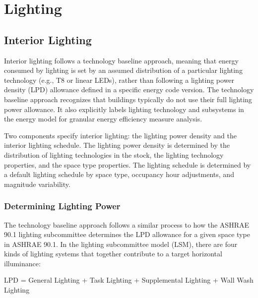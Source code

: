 \section{Lighting}
\subsection{Interior Lighting}
Interior lighting follows a technology baseline approach, meaning that energy consumed by lighting is set by an assumed distribution of a particular lighting technology (e.g., T8 or linear LEDs), rather than following a lighting power density (LPD) allowance defined in a specific energy code version. The technology baseline approach recognizes that buildings typically do not use their full lighting power allowance. It also explicitly labels lighting technology and subsystems in the energy model for granular energy efficiency measure analysis.  

Two components specify interior lighting: the lighting power density and the interior lighting schedule.  The lighting power density is determined by the distribution of lighting technologies in the stock, the lighting technology properties, and the space type properties. The lighting schedule is determined by a default lighting schedule by space type, occupancy hour adjustments, and magnitude variability.

\subsubsection{Determining Lighting Power}
The technology baseline approach follows a similar process to how the ASHRAE 90.1 lighting subcommittee determines the LPD allowance for a given space type in ASHRAE 90.1. In the lighting subcommittee model (LSM), there are four kinds of lighting systems that together contribute to a target horizontal illuminance:

LPD = General Lighting + Task Lighting + Supplemental Lighting + Wall Wash Lighting \\

